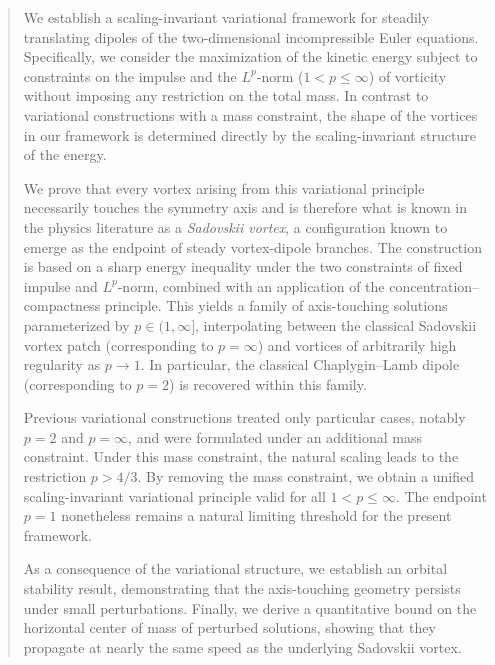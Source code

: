 \documentclass[11pt]{amsart}
\theoremstyle{definition}
\theoremstyle{definition}
\numberwithin{equation}{section}
\newcommand{\0}{\emptyset}
\begin{document}
    
	\begin{abstract}  
    We establish a scaling-invariant variational framework for steadily translating dipoles of the two-dimensional incompressible Euler equations. Specifically, we consider the maximization of the kinetic energy subject to constraints on the impulse and the $L^p$-norm ($1<p\leq \infty$) of vorticity without imposing any restriction on the total mass. In contrast to variational constructions with a mass constraint, the shape of the vortices in our framework is determined directly by the scaling-invariant structure of the energy.

    We prove that every vortex arising from this variational principle necessarily touches the symmetry axis and is therefore what is known in the physics literature as a \emph{Sadovskii vortex}, a configuration known to emerge as the endpoint of steady vortex-dipole branches. The construction is based on a sharp energy inequality under the two constraints of fixed impulse and $L^p$-norm, combined with an application of the concentration--compactness principle. This yields a family of axis-touching solutions parameterized by $p \in (1,\infty]$, interpolating between the classical Sadovskii vortex patch (corresponding to $p=\infty$) and vortices of arbitrarily high regularity as $p \to 1$. In particular, the classical Chaplygin--Lamb dipole (corresponding to $p=2$) is recovered within this family.

    Previous variational constructions treated only particular cases, notably $p=2$ and $p=\infty$, and were formulated under an additional mass constraint. Under this mass constraint, the natural scaling leads to the restriction $p>4/3$. By removing the mass constraint, we obtain a unified scaling-invariant variational principle valid for all $1<p\le\infty$. The endpoint $p=1$ nonetheless remains a natural limiting threshold for the present framework.

    As a consequence of the variational structure, we establish {an orbital} stability result, demonstrating that the axis-touching geometry persists under small perturbations. Finally, we derive a quantitative bound on the horizontal center of mass of perturbed solutions, showing that they propagate at nearly the same speed as the underlying Sadovskii vortex.
	\end{abstract}
    
	\maketitle
	
\end{document}
